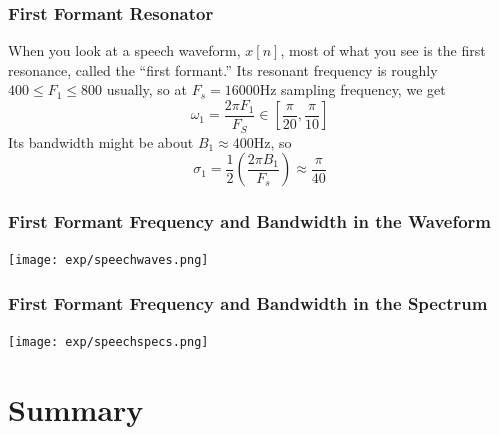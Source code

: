 \documentclass{beamer}
\begin{document}

\begin{frame}
  \frametitle{First Formant Resonator}

  When you look at a speech waveform, $x[n]$, most of what you see is
  the first resonance, called the ``first formant.''  Its resonant
  frequency is roughly $400\le F_1\le 800$ usually, so at $F_s=16000$Hz
  sampling frequency, we get
  \[
  \omega_1 = \frac{2\pi F_1}{F_S} \in \left[\frac{\pi}{20},\frac{\pi}{10}\right]
  \]
  Its bandwidth might be about $B_1\approx 400$Hz, so
  \[
  \sigma_1 = \frac{1}{2}\left(\frac{2\pi B_1}{F_s}\right) \approx \frac{\pi}{40}
  \]
\end{frame}

\begin{frame}
  \frametitle{First Formant Frequency and  Bandwidth in the Waveform}

  \centerline{\texttt{[image: exp/speechwaves.png]}}
\end{frame}


\begin{frame}
  \frametitle{First Formant Frequency and  Bandwidth in the Spectrum}

  \centerline{\texttt{[image: exp/speechspecs.png]}}
\end{frame}

\section[Summary]{Summary}
\setcounter{subsection}{1}
\end{document}
